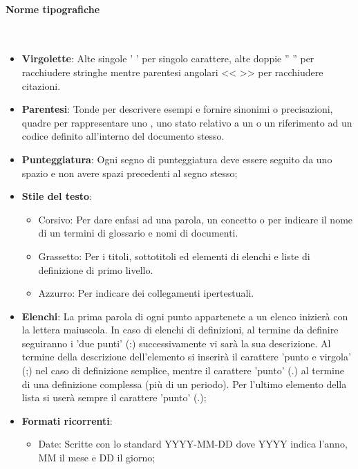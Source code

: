      \paragraph{Norme tipografiche}
     ~\\
        \begin{itemize}
            \item \textbf{Virgolette}: Alte singole ’ ’ per singolo carattere,  alte doppie ” ” per racchiudere stringhe mentre parentesi angolari <<  >> per racchiudere citazioni.
            \item \textbf{Parentesi}: Tonde  per  descrivere  esempi  e  fornire  sinonimi  o  precisazioni, quadre per rappresentare uno  , uno stato relativo a un
             o un riferimento ad un codice definito all'interno del documento stesso.
            \item \textbf{Punteggiatura}: Ogni  segno  di  punteggiatura  deve  essere  seguito  da  uno spazio e non avere spazi precedenti al segno stesso;
            \item \textbf{Stile del testo}:
                \begin{itemize}
                    \item Corsivo: Per dare enfasi ad una parola, un concetto o per indicare il nome di un
                    termini di glossario e nomi di  documenti.
                    \item Grassetto: Per i titoli, sottotitoli ed elementi di elenchi e liste di definizione di primo livello.
                    \item Azzurro: Per indicare dei collegamenti ipertestuali.
                \end{itemize}
            \item \textbf{Elenchi}: La prima parola di ogni punto appartenete a un elenco inizierà con la lettera maiuscola. In caso di elenchi di definizioni, al termine da definire seguiranno i ’due punti’ (:)  successivamente vi sarà la sua descrizione. Al termine della descrizione dell'elemento si inserirà il carattere ’punto e virgola’ (;) nel caso di definizione semplice, mentre il carattere 'punto' (.) al termine di una definizione complessa (più di un periodo).
            Per l’ultimo elemento della lista si userà sempre il carattere ’punto’ (.);
            \item \textbf{Formati ricorrenti}:
                \begin{itemize}
                    \item Date: Scritte con lo standard YYYY-MM-DD dove YYYY indica l’anno, MM il mese e DD il giorno;

\end{itemize}
\end{itemize}
